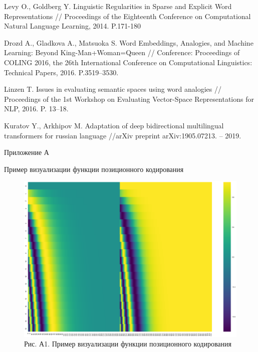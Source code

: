\documentclass[a4paper,14pt]{article}
\begin{document}
\begin{thebibliography}{30}
Levy O., Goldberg Y. Linguistic Regularities in Sparse and Explicit Word 	Representations // Proceedings of the Eighteenth Conference on Computational Natural Language Learning, 2014. P.171-180

Drozd A., Gladkova A., Matsuoka S. Word Embeddings, Analogies, and Machine Learning: Beyond King-Man+Woman=Queen // Conference: Proceedings of COLING 2016, the 26th International Conference on Computational Linguistics: Technical Papers, 2016. 
P.3519–3530.

Linzen T. Issues in evaluating semantic spaces using word analogies // Proceedings of the 1st Workshop on Evaluating Vector-Space Representations for NLP, 2016. P. 13–18.

Kuratov Y., Arkhipov M. Adaptation of deep bidirectional multilingual transformers for russian language //arXiv preprint arXiv:1905.07213. – 2019.


\end{thebibliography}

\newpage


\begin{flushright}
	Приложение А
\end{flushright}


\begin{center}
	Пример визуализации функции позиционного кодирования
\end{center}


\begin{figure}[H]
	\centering
	\includegraphics[width=0.95\linewidth]{image/v9dvohtljexbjop_vrykyyqdzbk}
	\caption*{Рис. А1. Пример визуализации функции позиционного кодирования}
	\label{fig:v9dvohtljexbjopvrykyyqdzbk}
\end{figure}
\end{document}
